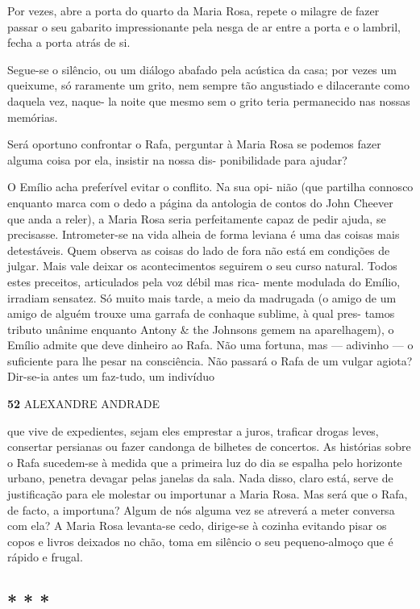 Por vezes, abre a porta do quarto da Maria Rosa, repete o milagre de
fazer passar o seu gabarito impressionante pela nesga de ar entre a
porta e o lambril, fecha a porta atrás de si.

Segue-se o silêncio, ou um diálogo abafado pela acústica da casa; por
vezes um queixume, só raramente um grito, nem sempre tão angustiado e
dilacerante como daquela vez, naque- la noite que mesmo sem o grito
teria permanecido nas nossas memórias.

Será oportuno confrontar o Rafa, perguntar à Maria Rosa se podemos fazer
alguma coisa por ela, insistir na nossa dis- ponibilidade para ajudar?

O Emílio acha preferível evitar o conflito. Na sua opi- nião (que
partilha connosco enquanto marca com o dedo a página da antologia de
contos do John Cheever que anda a reler), a Maria Rosa seria
perfeitamente capaz de pedir ajuda, se precisasse. Intrometer-se na vida
alheia de forma leviana é uma das coisas mais detestáveis. Quem observa
as coisas do lado de fora não está em condições de julgar. Mais vale
deixar os acontecimentos seguirem o seu curso natural. Todos estes
preceitos, articulados pela voz débil mas rica- mente modulada do
Emílio, irradiam sensatez. Só muito mais tarde, a meio da madrugada (o
amigo de um amigo de alguém trouxe uma garrafa de conhaque sublime, à
qual pres- tamos tributo unânime enquanto Antony \& the Johnsons gemem
na aparelhagem), o Emílio admite que deve dinheiro ao Rafa. Não uma
fortuna, mas --- adivinho --- o suficiente para lhe pesar na
consciência. Não passará o Rafa de um vulgar agiota? Dir-se-ia antes um
faz-tudo, um indivíduo

\textbf{52 }ALEXANDRE ANDRADE

que vive de expedientes, sejam eles emprestar a juros, traficar drogas
leves, consertar persianas ou fazer candonga de bilhetes de concertos.
As histórias sobre o Rafa sucedem-se à medida que a primeira luz do dia
se espalha pelo horizonte urbano, penetra devagar pelas janelas da sala.
Nada disso, claro está, serve de justificação para ele molestar ou
importunar a Maria Rosa. Mas será que o Rafa, de facto, a importuna?
Algum de nós alguma vez se atreverá a meter conversa com ela? A Maria
Rosa levanta-se cedo, dirige-se à cozinha evitando pisar os copos e
livros deixados no chão, toma em silêncio o seu pequeno-almoço que é
rápido e frugal.


\subsection{* * *}

